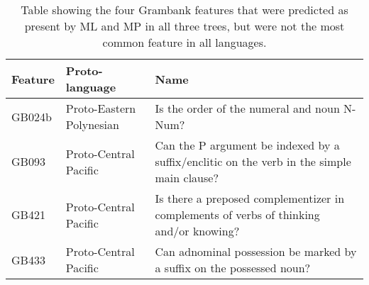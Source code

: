 \begin{table}[ht]
\centering
\begin{tabular}{p{2cm}p{4cm}p{8cm}}
  \toprule
\textbf{Feature} & \textbf{Proto-language} & \textbf{Name} \\ 
  \midrule
GB024b & Proto-Eastern Polynesian & Is the order of the numeral and noun N-Num? \\ 
  GB093 & Proto-Central Pacific & Can the P argument be indexed by a suffix/enclitic on the verb in the simple main clause? \\ 
  GB421 & Proto-Central Pacific & Is there a preposed complementizer in complements of verbs of thinking and/or knowing? \\ 
  GB433 & Proto-Central Pacific & Can adnominal possession be marked by a suffix on the possessed noun? \\ 
   \bottomrule
\end{tabular}
\caption{Table showing the four Grambank features that were predicted as present by ML and MP in all three trees, but were not the most common feature in all languages.} 
\label{table_extra_predictions_four}
\end{table}
